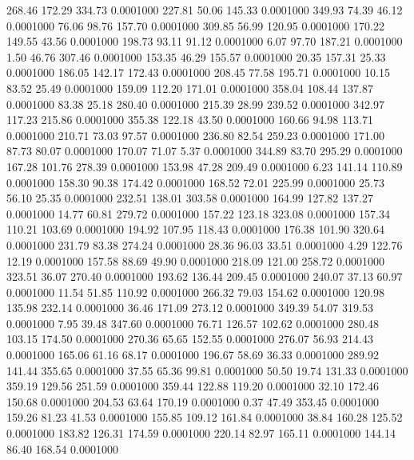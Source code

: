  268.46  172.29  334.73   0.0001000
 227.81   50.06  145.33   0.0001000
 349.93   74.39   46.12   0.0001000
  76.06   98.76  157.70   0.0001000
 309.85   56.99  120.95   0.0001000
 170.22  149.55   43.56   0.0001000
 198.73   93.11   91.12   0.0001000
   6.07   97.70  187.21   0.0001000
   1.50   46.76  307.46   0.0001000
 153.35   46.29  155.57   0.0001000
  20.35  157.31   25.33   0.0001000
 186.05  142.17  172.43   0.0001000
 208.45   77.58  195.71   0.0001000
  10.15   83.52   25.49   0.0001000
 159.09  112.20  171.01   0.0001000
 358.04  108.44  137.87   0.0001000
  83.38   25.18  280.40   0.0001000
 215.39   28.99  239.52   0.0001000
 342.97  117.23  215.86   0.0001000
 355.38  122.18   43.50   0.0001000
 160.66   94.98  113.71   0.0001000
 210.71   73.03   97.57   0.0001000
 236.80   82.54  259.23   0.0001000
 171.00   87.73   80.07   0.0001000
 170.07   71.07    5.37   0.0001000
 344.89   83.70  295.29   0.0001000
 167.28  101.76  278.39   0.0001000
 153.98   47.28  209.49   0.0001000
   6.23  141.14  110.89   0.0001000
 158.30   90.38  174.42   0.0001000
 168.52   72.01  225.99   0.0001000
  25.73   56.10   25.35   0.0001000
 232.51  138.01  303.58   0.0001000
 164.99  127.82  137.27   0.0001000
  14.77   60.81  279.72   0.0001000
 157.22  123.18  323.08   0.0001000
 157.34  110.21  103.69   0.0001000
 194.92  107.95  118.43   0.0001000
 176.38  101.90  320.64   0.0001000
 231.79   83.38  274.24   0.0001000
  28.36   96.03   33.51   0.0001000
   4.29  122.76   12.19   0.0001000
 157.58   88.69   49.90   0.0001000
 218.09  121.00  258.72   0.0001000
 323.51   36.07  270.40   0.0001000
 193.62  136.44  209.45   0.0001000
 240.07   37.13   60.97   0.0001000
  11.54   51.85  110.92   0.0001000
 266.32   79.03  154.62   0.0001000
 120.98  135.98  232.14   0.0001000
  36.46  171.09  273.12   0.0001000
 349.39   54.07  319.53   0.0001000
   7.95   39.48  347.60   0.0001000
  76.71  126.57  102.62   0.0001000
 280.48  103.15  174.50   0.0001000
 270.36   65.65  152.55   0.0001000
 276.07   56.93  214.43   0.0001000
 165.06   61.16   68.17   0.0001000
 196.67   58.69   36.33   0.0001000
 289.92  141.44  355.65   0.0001000
  37.55   65.36   99.81   0.0001000
  50.50   19.74  131.33   0.0001000
 359.19  129.56  251.59   0.0001000
 359.44  122.88  119.20   0.0001000
  32.10  172.46  150.68   0.0001000
 204.53   63.64  170.19   0.0001000
   0.37   47.49  353.45   0.0001000
 159.26   81.23   41.53   0.0001000
 155.85  109.12  161.84   0.0001000
  38.84  160.28  125.52   0.0001000
 183.82  126.31  174.59   0.0001000
 220.14   82.97  165.11   0.0001000
 144.14   86.40  168.54   0.0001000
